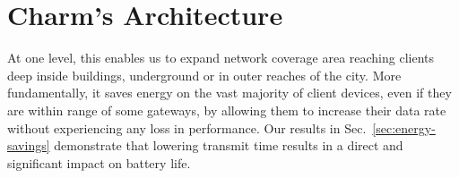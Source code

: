 \section{Charm's Architecture}
\label{sec:arch}



  At one
level, this enables us to expand network coverage area reaching clients deep
inside buildings, underground or in outer reaches of the city. More
fundamentally, it saves energy on the vast majority of client devices, even if
they are within range of some gateways, by allowing them to increase their
data rate without experiencing any loss in performance. Our results in
Sec.~\ref{sec:energy-savings} demonstrate that lowering transmit time results
in a direct and significant impact on battery life.

